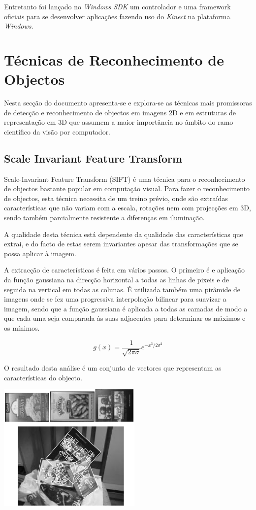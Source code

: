 Entretanto foi lançado no \emph{Windows SDK} um controlador e uma framework oficiais para se 
desenvolver aplicações fazendo uso do \emph{Kinect} na plataforma \emph{Windows}.


\section{Técnicas de Reconhecimento de Objectos}\label{objdetect}

Nesta secção do documento apresenta-se e explora-se as técnicas mais
promissoras de detecção e reconhecimento de objectos em imagens 2D e
em estruturas de representação em 3D que assumem a maior importância 
no âmbito do ramo científico da visão por computador.

\subsection[SIFT]{Scale Invariant Feature Transform}\label{sift}

Scale-Invariant Feature Transform (SIFT) \cite{Lowe:1999:ORL:850924.851523} é uma técnica
para o reconhecimento de objectos bastante popular em computação visual. Para fazer o 
reconhecimento de objectos, esta técnica necessita de um treino prévio, onde
são extraídas características que não variam com a escala, rotações nem com projecções em 3D,
sendo também parcialmente resistente a diferenças em iluminação.

A qualidade desta técnica está dependente da qualidade das características que extrai,
e do facto de estas serem invariantes apesar das transformações que se possa aplicar à imagem.

A extracção de características é feita em vários passos. O primeiro é e
aplicação da função gaussiana na direcção horizontal a todas as linhas de pixeis
 e de seguida na vertical em todas as colunas.
É utilizada também uma pirâmide de imagens onde se fez uma progressiva interpolação
bilinear para suavizar a imagem, sendo que  a função gaussiana é aplicada a
todas as camadas de modo a que cada uma seja comparada às suas adjacentes
para determinar os máximos e os mínimos.

\[
g(x) = \frac{1}{\sqrt{2\pi\sigma}}e^{-x^3 / 2 \sigma^2}
\]

O resultado desta análise é um conjunto de vectores que representam as
características do objecto. 


\begin{center}
	\includegraphics[scale=1.00]{figures/sift_img.png}
	\label{fig:1}
\end{center}

